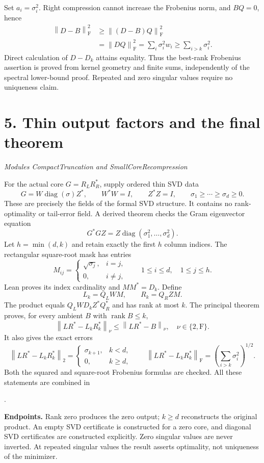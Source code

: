 \documentclass[11pt]{article}
\newcommand{\norm}[1]{\left\lVert#1\right\rVert}
\newcommand{\rank}{\operatorname{rank}}
\newcommand{\diag}{\operatorname{diag}}
\newcommand{\pageheading}[2]{\section*{\color{ink}#1}\textit{#2}\par}
\begin{document}
Set $a_i=\sigma_i^2$. Right compression cannot increase the Frobenius norm, and $BQ=0$, hence
\[
\begin{aligned}
\norm{D-B}_{\mathrm F}^{2}
&\geq\norm{(D-B)Q}_{\mathrm F}^{2}\\
&=\norm{DQ}_{\mathrm F}^{2}
=\sum_i\sigma_i^2w_i
\geq\sum_{i>k}\sigma_i^2.
\end{aligned}
\]
Direct calculation of $D-D_k$ attains equality. Thus the best-rank Frobenius assertion is proved from kernel geometry and finite sums, independently of the spectral lower-bound proof. Repeated and zero singular values require no uniqueness claim.

\newpage
\pageheading{5. Thin output factors and the final theorem}{Modules CompactTruncation and SmallCoreRecompression}
For the actual core $G=R_LR_R^*$, supply ordered thin SVD data
\[
G=W\diag(\sigma)Z^*,\qquad W^*W=I,
\qquad Z^*Z=I,\qquad \sigma_1\geq\cdots\geq\sigma_d\geq0.
\]
These are precisely the fields of the formal SVD structure. It contains no rank-optimality or tail-error field. A derived theorem checks the Gram eigenvector equation
\[
G^*GZ=Z\diag(\sigma_1^2,\ldots,\sigma_d^2).
\]
Let $h=\min(d,k)$ and retain exactly the first $h$ column indices. The rectangular square-root mask has entries
\[
M_{ij}=\begin{cases}\sqrt{\sigma_j},&i=j,\\0,&i\ne j,\end{cases}
\qquad 1\leq i\leq d,\quad 1\leq j\leq h.
\]
Lean proves its index cardinality and $MM^*=D_k$. Define
\[
\boxed{L_k=Q_LWM,\qquad R_k=Q_RZM.}
\]
The product equals $Q_LWD_kZ^*Q_R^*$ and has rank at most $k$. The principal theorem proves, for every ambient $B$ with $\rank B\leq k$,
\[
\boxed{\norm{LR^*-L_kR_k^*}_\nu\leq\norm{LR^*-B}_\nu,
\quad\nu\in\{2,\mathrm F\}.}
\]
It also gives the exact errors
\[
\norm{LR^*-L_kR_k^*}_2=
\begin{cases}\sigma_{k+1},&k<d,\\0,&k\geq d,\end{cases}
\qquad
\norm{LR^*-L_kR_k^*}_{\mathrm F}
=\left(\sum_{i>k}\sigma_i^2\right)^{1/2}.
\]
Both the squared and square-root Frobenius formulas are checked. All these statements are combined in\par
{}.

\textbf{Endpoints.} Rank zero produces the zero output; $k\geq d$ reconstructs the original product. An empty SVD certificate is constructed for a zero core, and diagonal SVD certificates are constructed explicitly. Zero singular values are never inverted. At repeated singular values the result asserts optimality, not uniqueness of the minimizer.
\end{document}
